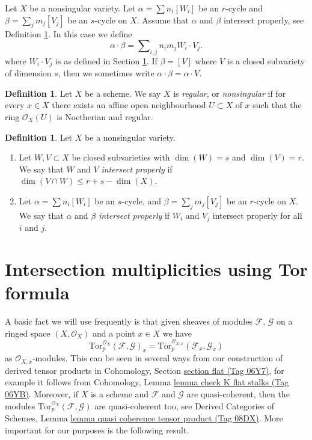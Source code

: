 \documentclass{amsart}
\theoremstyle{plain}
\theoremstyle{definition}
\newtheorem{definition}[subsection]{Definition}
\theoremstyle{remark}
\numberwithin{equation}{subsection}
\begin{document}
\noindent
Let $X$ be a nonsingular variety. Let
$\alpha = \sum n_i [W_i]$ be an $r$-cycle and
$\beta = \sum_j m_j [V_j]$ be an $s$-cycle on $X$.
Assume that $\alpha$ and $\beta$ intersect properly, see
Definition \ref{definition-proper-intersection}.
In this case we define
$$
\alpha \cdot \beta = \sum\nolimits_{i,j} n_i m_j W_i \cdot V_j.
$$
where $W_i \cdot V_j$ is as defined in Section \ref{section-tor-formula}.
If $\beta = [V]$ where $V$ is a closed subvariety of dimension $s$,
then we sometimes write $\alpha \cdot \beta = \alpha \cdot V$.



\begin{definition}
\label{properties-definition-regular}
Let $X$ be a scheme. We say $X$ is {\it regular}, or {\it nonsingular} if
for every $x \in X$ there exists an affine open neighbourhood
$U \subset X$ of $x$ such that the ring $\mathcal{O}_X(U)$ is
Noetherian and regular.
\end{definition}

\begin{definition}
\label{definition-proper-intersection}
Let $X$ be a nonsingular variety.
\begin{enumerate}
\item Let $W,V \subset X$ be closed subvarieties with
$\dim(W) = s$ and $\dim(V) = r$. We say that $W$ and $V$
{\it intersect properly} if $\dim(V \cap W) \leq r + s - \dim(X)$.
\item Let $\alpha = \sum n_i [W_i]$ be an $s$-cycle,
and $\beta = \sum_j m_j [V_j]$ be an $r$-cycle on $X$. We say
that $\alpha$ and $\beta$ {\it intersect properly} if
$W_i$ and $V_j$ intersect properly for all $i$ and $j$.
\end{enumerate}
\end{definition}

\section{Intersection multiplicities using Tor formula}
\label{section-tor-formula}

\noindent
A basic fact we will use frequently is that given sheaves of
modules $\mathcal{F}$, $\mathcal{G}$ on a ringed space $(X, \mathcal{O}_X)$
and a point $x \in X$ we have
$$
\text{Tor}_p^{\mathcal{O}_X}(\mathcal{F}, \mathcal{G})_x =
\text{Tor}_p^{\mathcal{O}_{X, x}}(\mathcal{F}_x, \mathcal{G}_x)
$$
as $\mathcal{O}_{X, x}$-modules. This can be seen in several ways
from our construction of derived tensor products in
Cohomology, Section \href{https://stacks.math.columbia.edu/tag/06Y7}{section flat (Tag 06Y7)}, for example it follows from
Cohomology, Lemma \href{https://stacks.math.columbia.edu/tag/06YB}{lemma check K flat stalks (Tag 06YB)}.
Moreover, if $X$ is a scheme and $\mathcal{F}$ and $\mathcal{G}$
are quasi-coherent, then the modules
$\text{Tor}_p^{\mathcal{O}_X}(\mathcal{F}, \mathcal{G})$ are
quasi-coherent too, see
Derived Categories of Schemes, Lemma
\href{https://stacks.math.columbia.edu/tag/08DX}{lemma quasi coherence tensor product (Tag 08DX)}.
More important for our purposes is the following result.
\end{document}
